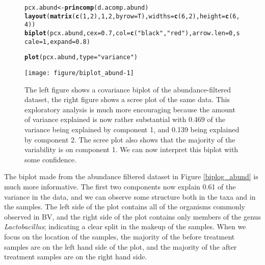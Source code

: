 \documentclass[11pt]{article}\usepackage[]{graphicx}\usepackage[]{color}
\makeatletter
\def\maxwidth{ %
  \ifdim\Gin@nat@width>\linewidth
    \linewidth
  \else
    \Gin@nat@width
  \fi
}
\newcommand{\hlnum}[1]{\textcolor[rgb]{0.686,0.059,0.569}{#1}}%
\newcommand{\hlstr}[1]{\textcolor[rgb]{0.192,0.494,0.8}{#1}}%
\newcommand{\hlstd}[1]{\textcolor[rgb]{0.345,0.345,0.345}{#1}}%
\newcommand{\hlkwb}[1]{\textcolor[rgb]{0.69,0.353,0.396}{#1}}%
\newcommand{\hlkwc}[1]{\textcolor[rgb]{0.333,0.667,0.333}{#1}}%
\newcommand{\hlkwd}[1]{\textcolor[rgb]{0.737,0.353,0.396}{\textbf{#1}}}%
\newenvironment{kframe}{%
 \def\at@end@of@kframe{}%
 \ifinner\ifhmode%
  \def\at@end@of@kframe{\end{minipage}}%
  \begin{minipage}{\columnwidth}%
 \fi\fi%
 \def\FrameCommand##1{\hskip\@totalleftmargin \hskip-\fboxsep
 \colorbox{shadecolor}{##1}\hskip-\fboxsep
     \hskip-\linewidth \hskip-\@totalleftmargin \hskip\columnwidth}%
 \MakeFramed {\advance\hsize-\width
   \@totalleftmargin\z@ \linewidth\hsize
   \@setminipage}}%
 {\par\unskip\endMakeFramed%
 \at@end@of@kframe}
\newenvironment{knitrout}{}{} %
\makeatother
\begin{document}
\begin{figure}
\begin{center}

\begin{knitrout}
\color{fgcolor}\begin{kframe}
\begin{alltt}
\hlstd{pcx.abund} \hlkwb{<-} \hlkwd{princomp}\hlstd{(d.acomp.abund)}
\hlkwd{layout}\hlstd{(}\hlkwd{matrix}\hlstd{(}\hlkwd{c}\hlstd{(}\hlnum{1}\hlstd{,}\hlnum{2}\hlstd{),}\hlnum{1}\hlstd{,}\hlnum{2}\hlstd{,} \hlkwc{byrow}\hlstd{=T),} \hlkwc{widths}\hlstd{=}\hlkwd{c}\hlstd{(}\hlnum{6}\hlstd{,}\hlnum{2}\hlstd{),} \hlkwc{height}\hlstd{=}\hlkwd{c}\hlstd{(}\hlnum{6}\hlstd{,}\hlnum{4}\hlstd{))}
\hlkwd{biplot}\hlstd{(pcx.abund,} \hlkwc{cex}\hlstd{=}\hlnum{0.7}\hlstd{,} \hlkwc{col}\hlstd{=}\hlkwd{c}\hlstd{(}\hlstr{"black"}\hlstd{,} \hlstr{"red"}\hlstd{),} \hlkwc{arrow.len}\hlstd{=}\hlnum{0}\hlstd{,} \hlkwc{scale}\hlstd{=}\hlnum{1}\hlstd{,} \hlkwc{expand}\hlstd{=}\hlnum{0.8}\hlstd{)}

\hlkwd{plot}\hlstd{(pcx.abund,} \hlkwc{type}\hlstd{=}\hlstr{"variance"}\hlstd{)}
\end{alltt}
\end{kframe}
\texttt{[image: figure/biplot\_abund-1]} 

\end{knitrout}
\caption{The left figure shows a covariance biplot of the abundance-filtered dataset, the right figure shows a scree plot of the same data. This exploratory analysis is much more encouraging because  the amount of variance explained is now rather substantial with 0.469 of the variance being explained by component 1, and 0.139 being explained by component 2. The scree plot also shows that the majority of the variability is on component 1. We can now interpret this biplot with some confidence. }
\label{biplot_abund}
\end{center}
\end{figure}

The biplot made from the abundance filtered dataset in Figure \ref{biplog_abund} is much more informative. The first two components now explain  0.61 of the variance in the data, and we can observe some structure both in the taxa and in the samples. The left side of the plot contains all of the organisms commonly observed in BV, and the right side of the plot contains only members of the genus \emph{Lactobacillus}; indicating a clear split in the makeup of the samples. When we focus on the location of the samples,  the majority of the before treatment samples are on the left hand side of the plot, and the majority of the after treatment samples are on the right hand side. 
\end{document}
